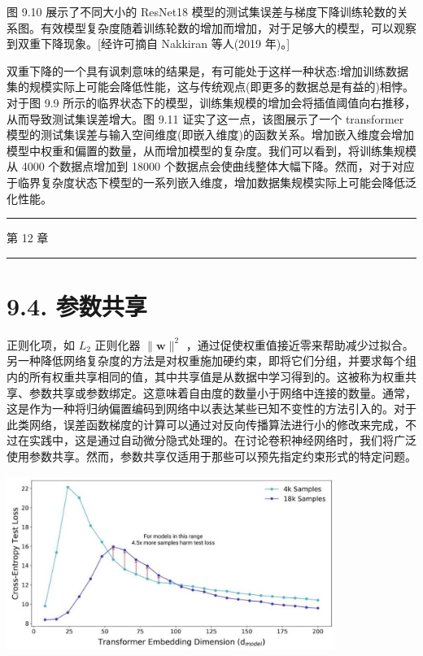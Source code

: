 \documentclass[10pt]{report}
\newcommand{\HRule}{\begin{center}\rule{0.9\linewidth}{0.2mm}\end{center}}
\begin{document}
图 9.10 展示了不同大小的 ResNet18 模型的测试集误差与梯度下降训练轮数的关系图。有效模型复杂度随着训练轮数的增加而增加，对于足够大的模型，可以观察到双重下降现象。[经许可摘自 Nakkiran 等人(2019 年)。]

双重下降的一个具有讽刺意味的结果是，有可能处于这样一种状态:增加训练数据集的规模实际上可能会降低性能，这与传统观点(即更多的数据总是有益的)相悖。对于图 9.9 所示的临界状态下的模型，训练集规模的增加会将插值阈值向右推移，从而导致测试集误差增大。图 9.11 证实了这一点，该图展示了一个 transformer 模型的测试集误差与输入空间维度(即嵌入维度)的函数关系。增加嵌入维度会增加模型中权重和偏置的数量，从而增加模型的复杂度。我们可以看到，将训练集规模从 4000 个数据点增加到 18000 个数据点会使曲线整体大幅下降。然而，对于对应于临界复杂度状态下模型的一系列嵌入维度，增加数据集规模实际上可能会降低泛化性能。

\HRule

第 12 章

\HRule

\section*{9.4. 参数共享}

正则化项，如 \({L}_{2}\) 正则化器 \(\parallel \mathbf{w}{\parallel }^{2}\) ，通过促使权重值接近零来帮助减少过拟合。另一种降低网络复杂度的方法是对权重施加硬约束，即将它们分组，并要求每个组内的所有权重共享相同的值，其中共享值是从数据中学习得到的。这被称为权重共享、参数共享或参数绑定。这意味着自由度的数量小于网络中连接的数量。通常，这是作为一种将归纳偏置编码到网络中以表达某些已知不变性的方法引入的。对于此类网络，误差函数梯度的计算可以通过对反向传播算法进行小的修改来完成，不过在实践中，这是通过自动微分隐式处理的。在讨论卷积神经网络时，我们将广泛使用参数共享。然而，参数共享仅适用于那些可以预先指定约束形式的特定问题。

\begin{center}
\includegraphics[max width=0.8\textwidth]{images/0194e279-9b28-703a-88f4-c3ac21e2010d_290_383_371_1020_540_0.jpg}
\end{center}
\hspace*{3em} 
\end{document}
